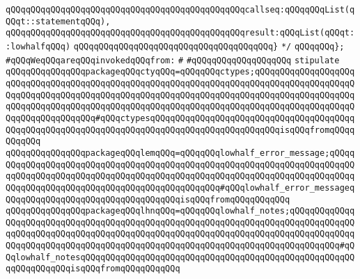 \verb|qQQqqQQqqQQqqQQqqQQqqQQqqQQqqQQqqQQqqQQqqQQqqQQqcallseq:qQQqqQQqList(qQQqt::statementqQQq),|\newline
\verb|qQQqqQQqqQQqqQQqqQQqqQQqqQQqqQQqqQQqqQQqqQQqqQQqresult:qQQqList(qQQqt::lowhalfqQQq)|\newline
\verb|qQQqqQQqqQQqqQQqqQQqqQQqqQQqqQQqqQQqqQQq}|\newline
\verb|*/|\newline
\newline
\verb|qQQqqQQq};|\newline
\newline
\verb|#qQQqWeqQQqareqQQqinvokedqQQqfrom:|\newline
\verb|#|\newline
\verb|#qQQqqQQqqQQqqQQqqQQq|\newline
\newline
\verb|stipulate|\newline
\verb|qQQqqQQqqQQqqQQqpackageqQQqctyqQQq=qQQqqQQqctypes;qQQqqQQqqQQqqQQqqQQqqQQqqQQqqQQqqQQqqQQqqQQqqQQqqQQqqQQqqQQqqQQqqQQqqQQqqQQqqQQqqQQqqQQqqQQqqQQqqQQqqQQqqQQqqQQqqQQqqQQqqQQqqQQqqQQqqQQqqQQqqQQqqQQqqQQqqQQqqQQqqQQqqQQqqQQqqQQqqQQqqQQqqQQqqQQqqQQqqQQqqQQqqQQqqQQqqQQqqQQqqQQqqQQqqQQqqQQqqQQqqQQqqQQq#qQQqctypesqQQqqQQqqQQqqQQqqQQqqQQqqQQqqQQqqQQqqQQqqQQqqQQqqQQqqQQqqQQqqQQqqQQqqQQqqQQqqQQqqQQqqQQqqQQqqQQqisqQQqfromqQQqqQQqqQQq|\newline
\verb|qQQqqQQqqQQqqQQqpackageqQQqlemqQQq=qQQqqQQqlowhalf_error_message;qQQqqQQqqQQqqQQqqQQqqQQqqQQqqQQqqQQqqQQqqQQqqQQqqQQqqQQqqQQqqQQqqQQqqQQqqQQqqQQqqQQqqQQqqQQqqQQqqQQqqQQqqQQqqQQqqQQqqQQqqQQqqQQqqQQqqQQqqQQqqQQqqQQqqQQqqQQqqQQqqQQqqQQqqQQqqQQqqQQqqQQqqQQq#qQQqlowhalf_error_messageqQQqqQQqqQQqqQQqqQQqqQQqqQQqqQQqqQQqisqQQqfromqQQqqQQqqQQq|\newline
\verb|qQQqqQQqqQQqqQQqpackageqQQqlhnqQQq=qQQqqQQqlowhalf_notes;qQQqqQQqqQQqqQQqqQQqqQQqqQQqqQQqqQQqqQQqqQQqqQQqqQQqqQQqqQQqqQQqqQQqqQQqqQQqqQQqqQQqqQQqqQQqqQQqqQQqqQQqqQQqqQQqqQQqqQQqqQQqqQQqqQQqqQQqqQQqqQQqqQQqqQQqqQQqqQQqqQQqqQQqqQQqqQQqqQQqqQQqqQQqqQQqqQQqqQQqqQQqqQQqqQQqqQQqqQQq#qQQqlowhalf_notesqQQqqQQqqQQqqQQqqQQqqQQqqQQqqQQqqQQqqQQqqQQqqQQqqQQqqQQqqQQqqQQqqQQqisqQQqfromqQQqqQQqqQQq|\newline
